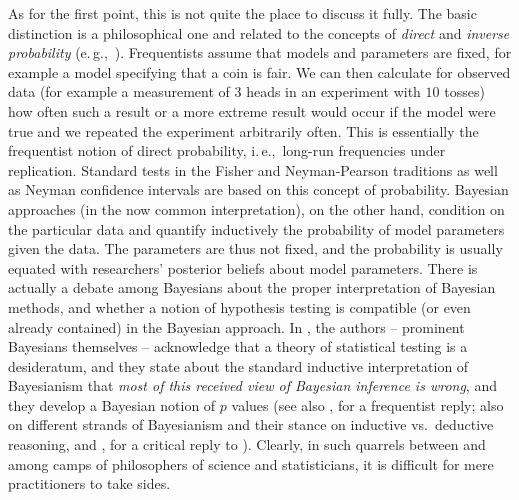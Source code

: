 \documentclass[USenglish]{article}
\newcommand{\eg}{e.\,g.,}
\newcommand{\ie}{i.\,e.,}
\begin{document}
As for the first point, this is not quite the place to discuss it fully.
The basic distinction is a philosophical one and related to the concepts of \textit{direct} and \textit{inverse probability} (\eg\ \citealp{Senn2011}).
Frequentists assume that models and parameters are fixed, for example a model specifying that a coin is fair.
We can then calculate for observed data (for example a measurement of $3$ heads in an experiment with $10$ tosses) how often such a result or a more extreme result would occur if the model were true and we repeated the experiment arbitrarily often.
This is essentially the frequentist notion of direct probability, \ie\ long-run frequencies under replication.
Standard tests in the Fisher and Neyman-Pearson traditions as well as Neyman confidence intervals are based on this concept of probability.
Bayesian approaches (in the now common interpretation), on the other hand, condition on the particular data and quantify inductively the probability of model parameters given the data.
The parameters are thus not fixed, and the probability is usually equated with researchers' posterior beliefs about model parameters.
There is actually a debate among Bayesians about the proper interpretation of Bayesian methods, and whether a notion of hypothesis testing is compatible (or even already contained) in the Bayesian approach.
In \citet[10]{GelmanShalizi2013}, the authors -- prominent Bayesians themselves -- acknowledge that a theory of statistical testing is a desideratum, and they state about the standard inductive interpretation of Bayesianism that \textit{most of this received view of Bayesian inference is wrong}, and they develop a Bayesian notion of $p$ values (see also \citealp{Mayo2013}, for a frequentist reply; also \citealp{Senn2011} on different strands of Bayesianism and their stance on inductive vs.\ deductive reasoning, and \citealp{Mayo2011}, for a critical reply to \citealp{Senn2011}).
Clearly, in such quarrels between and among camps of philosophers of science and statisticians, it is difficult for mere practitioners to take sides.
\end{document}
